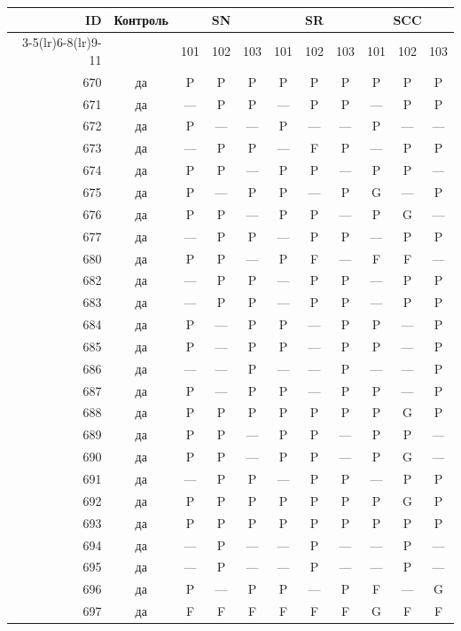 \begin{table}[p]\centering\small
\begin{tabular*}{\textwidth}{@{\extracolsep{\fill}}rc*{9}{c}@{}}\toprule
ID & Контроль & \multicolumn{3}{c}{SN} & \multicolumn{3}{c}{SR} & \multicolumn{3}{c}{SCC}\\
\cmidrule(lr){3-5}\cmidrule(lr){6-8}\cmidrule(lr){9-11}
 & & 101 & 102 & 103 & 101 & 102 & 103 & 101 & 102 & 103\\\midrule
670 & да & P & P & P & P & P & P & P & P & P\\
671 & да & — & P & P & — & P & P & — & P & P\\
672 & да & P & — & — & P & — & — & P & — & —\\
673 & да & — & P & P & — & F & P & — & P & P\\
674 & да & P & P & — & P & P & — & P & P & —\\
675 & да & P & — & P & P & — & P & G & — & P\\
676 & да & P & P & — & P & P & — & P & G & —\\
677 & да & — & P & P & — & P & P & — & P & P\\
680 & да & P & P & — & P & F & — & F & F & —\\
682 & да & — & P & P & — & P & P & — & P & P\\
683 & да & — & P & P & — & P & P & — & P & P\\
684 & да & P & — & P & P & — & P & P & — & P\\
685 & да & P & — & P & P & — & P & P & — & P\\
686 & да & — & — & P & — & — & P & — & — & P\\
687 & да & P & — & P & P & — & P & P & — & P\\
688 & да & P & P & P & P & P & P & P & G & P\\
689 & да & P & P & — & P & P & — & P & P & —\\
690 & да & P & P & — & P & P & — & P & G & —\\
691 & да & — & P & P & — & P & P & — & P & P\\
692 & да & P & P & P & P & P & P & P & G & P\\
693 & да & P & P & P & P & P & P & P & P & P\\
694 & да & — & P & — & — & P & — & — & P & —\\
695 & да & — & P & — & — & P & — & — & P & —\\
696 & да & P & — & P & P & — & P & F & — & G\\
697 & да & F & F & F & F & F & F & G & F & F\\

\end{tabular*}
\end{table}
